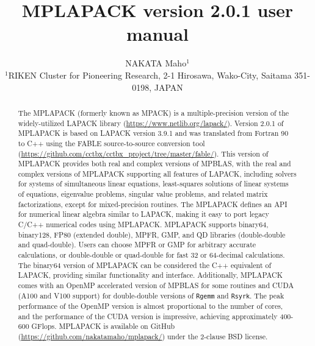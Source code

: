 \documentclass[12pt]{article}
\begin{document}
  \title{\sf MPLAPACK version 2.0.1 user manual}
  \author{NAKATA Maho$^1$\\
  \normalsize
  $^1$RIKEN Cluster for Pioneering Research, 2-1 Hirosawa, Wako-City, Saitama 351-0198, JAPAN}

\date{}

\maketitle

\begin{abstract}
The MPLAPACK (formerly known as MPACK) is a multiple-precision version of the widely-utilized LAPACK library (\url{https://www.netlib.org/lapack/}). Version 2.0.1 of MPLAPACK is based on LAPACK version 3.9.1 and was translated from Fortran 90 to C++ using the FABLE source-to-source conversion tool (\url{https://github.com/cctbx/cctbx_project/tree/master/fable/}). This version of MPLAPACK provides both real and complex versions of MPBLAS, with the real and complex versions of MPLAPACK supporting all features of LAPACK, including solvers for systems of simultaneous linear equations, least-squares solutions of linear systems of equations, eigenvalue problems, singular value problems, and related matrix factorizations, except for mixed-precision routines. The MPLAPACK defines an API for numerical linear algebra similar to LAPACK, making it easy to port legacy C/C++ numerical codes using MPLAPACK. MPLAPACK supports binary64, binary128, FP80 (extended double), MPFR, GMP, and QD libraries (double-double and quad-double). Users can choose MPFR or GMP for arbitrary accurate calculations, or double-double or quad-double for fast 32 or 64-decimal calculations. The binary64 version of MPLAPACK can be considered the C++ equivalent of LAPACK, providing similar functionality and interface. Additionally, MPLAPACK comes with an OpenMP accelerated version of MPBLAS for some routines and CUDA (A100 and V100 support) for double-double versions of {\tt Rgemm} and {\tt Rsyrk}. The peak performance of the OpenMP version is almost proportional to the number of cores, and the performance of the CUDA version is impressive, achieving approximately 400-600 GFlops. MPLAPACK is available on GitHub (\url{https://github.com/nakatamaho/mplapack/}) under the 2-clause BSD license.
\end{abstract}
\end{document}
